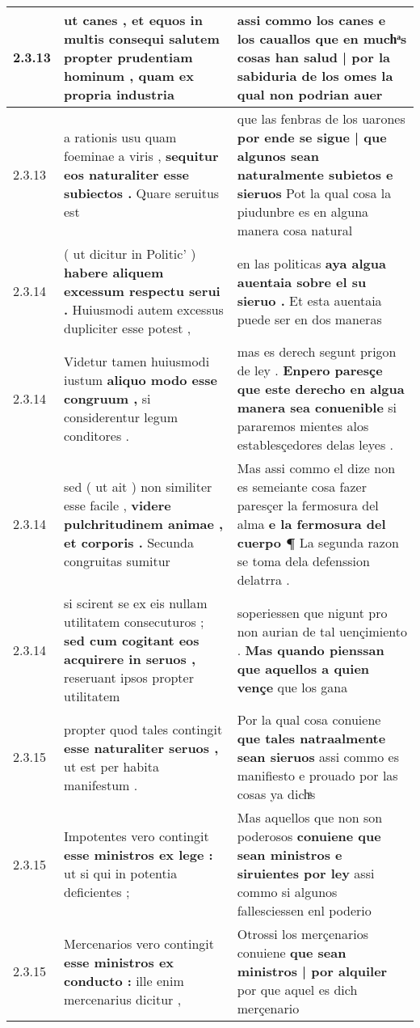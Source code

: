 \begin{tabular}{|p{1cm}|p{6.5cm}|p{6.5cm}|}
2.3.13 & ut canes , et equos in multis \textbf{ consequi salutem propter prudentiam hominum , } quam ex propria industria & assi commo los canes e los cauallos \textbf{ que en muchͣs cosas han salud | por la sabiduria de los omes } la qual non podrian auer \\\hline
2.3.13 & a rationis usu quam foeminae a viris , \textbf{ sequitur eos naturaliter esse subiectos . } Quare seruitus est & que las fenbras de los uarones \textbf{ por ende se sigue | que algunos sean naturalmente subietos e sieruos } Pot la qual cosa la piudunbre es en alguna manera cosa natural \\\hline
2.3.14 & ( ut dicitur in Politic’ ) \textbf{ habere aliquem excessum respectu serui . } Huiusmodi autem excessus dupliciter esse potest , & en las politicas \textbf{ aya algua auentaia sobre el su sieruo . } Et esta auentaia puede ser en dos maneras \\\hline
2.3.14 & Videtur tamen huiusmodi iustum \textbf{ aliquo modo esse congruum , } si considerentur legum conditores . & mas es derech segunt prigon de ley . \textbf{ Enpero paresçe que este derecho en algua manera sea conuenible } si pararemos mientes alos establesçedores delas leyes . \\\hline
2.3.14 & sed ( ut ait ) non similiter esse facile , \textbf{ videre pulchritudinem animae , et corporis . } Secunda congruitas sumitur & Mas assi commo el dize non es semeiante cosa fazer paresçer la fermosura del alma \textbf{ e la fermosura del cuerpo ¶ } La segunda razon se toma dela defenssion delatrra . \\\hline
2.3.14 & si scirent se ex eis nullam utilitatem consecuturos ; \textbf{ sed cum cogitant eos acquirere in seruos , } reseruant ipsos propter utilitatem & soperiessen que nigunt pro non aurian de tal uençimiento . \textbf{ Mas quando pienssan que aquellos a quien vençe } que los gana \\\hline
2.3.15 & propter quod tales contingit \textbf{ esse naturaliter seruos , } ut est per habita manifestum . & Por la qual cosa conuiene \textbf{ que tales natraalmente sean sieruos } assi commo es manifiesto e prouado por las cosas ya dichͣs \\\hline
2.3.15 & Impotentes vero contingit \textbf{ esse ministros ex lege : } ut si qui in potentia deficientes ; & Mas aquellos que non son poderosos \textbf{ conuiene que sean ministros e siruientes por ley } assi commo si algunos fallesciessen enl poderio \\\hline
2.3.15 & Mercenarios vero contingit \textbf{ esse ministros ex conducto : } ille enim mercenarius dicitur , & Otrossi los merçenarios conuiene \textbf{ que sean ministros | por alquiler } por que aquel es dich merçenario \\\hline

\end{tabular}
